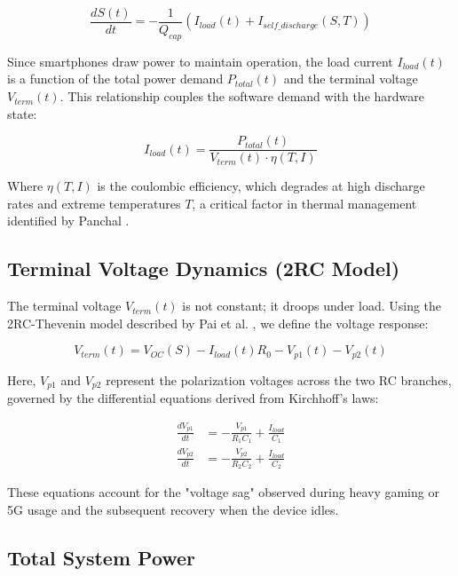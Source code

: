 \documentclass[12pt]{article}
\begin{document}
\begin{equation} \label{eq:soc_ode}
\frac{dS(t)}{dt} = - \frac{1}{Q_{cap}} \left( I_{load}(t) + I_{self\_discharge}(S, T) \right)
\end{equation}

Since smartphones draw power to maintain operation, the load current $I_{load}(t)$ is a function of the total power demand $P_{total}(t)$ and the terminal voltage $V_{term}(t)$. This relationship couples the software demand with the hardware state:

\begin{equation} \label{eq:current_load}
I_{load}(t) = \frac{P_{total}(t)}{V_{term}(t) \cdot \eta(T, I)}
\end{equation}

Where $\eta(T, I)$ is the coulombic efficiency, which degrades at high discharge rates and extreme temperatures $T$, a critical factor in thermal management identified by Panchal \cite{14}.

\subsection{Terminal Voltage Dynamics (2RC Model)}

The terminal voltage $V_{term}(t)$ is not constant; it droops under load. Using the 2RC-Thevenin model described by Pai et al. \cite{6}, we define the voltage response:

\begin{equation} \label{eq:voltage_term}
V_{term}(t) = V_{OC}(S) - I_{load}(t)R_0 - V_{p1}(t) - V_{p2}(t)
\end{equation}

Here, $V_{p1}$ and $V_{p2}$ represent the polarization voltages across the two RC branches, governed by the differential equations derived from Kirchhoff's laws:

\begin{align}
\frac{dV_{p1}}{dt} &= -\frac{V_{p1}}{R_1 C_1} + \frac{I_{load}}{C_1} \\
\frac{dV_{p2}}{dt} &= -\frac{V_{p2}}{R_2 C_2} + \frac{I_{load}}{C_2}
\end{align}

These equations account for the "voltage sag" observed during heavy gaming or 5G usage and the subsequent recovery when the device idles.

\subsection{Total System Power}
\end{document}
